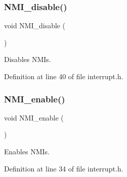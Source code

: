 \subsubsection{\texorpdfstring{N\+M\+I\+\_\+disable()}{NMI\_disable()}}
{\footnotesize\ttfamily void N\+M\+I\+\_\+disable (\begin{DoxyParamCaption}{ }\end{DoxyParamCaption})}



Disables N\+MI\textquotesingle{}s. 



Definition at line 40 of file interrupt.\+h.

\mbox{\label{a00020_adecc6bfc28b1d14005a070b0159c8225_adecc6bfc28b1d14005a070b0159c8225}} 
\subsubsection{\texorpdfstring{N\+M\+I\+\_\+enable()}{NMI\_enable()}}
{\footnotesize\ttfamily void N\+M\+I\+\_\+enable (\begin{DoxyParamCaption}{ }\end{DoxyParamCaption})}



Enables N\+MI\textquotesingle{}s. 



Definition at line 34 of file interrupt.\+h.

